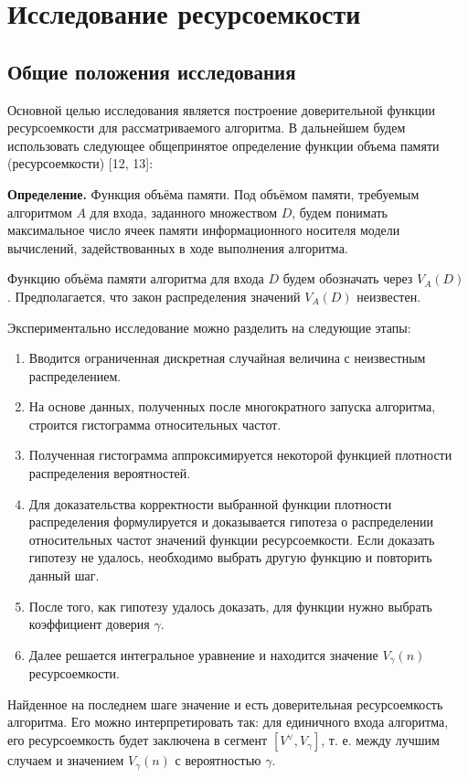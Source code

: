 \section{Исследование ресурсоемкости}
\subsection{Общие положения исследования}

Основной целью исследования является построение доверительной
функции ресурсоемкости для рассматриваемого алгоритма. В дальнейшем будем использовать следующее общепринятое определение функции объема памяти (ресурсоемкости) [12, 13]:
\par
\textbf{Определение.} Функция объёма памяти. Под объёмом памяти, требуемым алгоритмом $A$ для входа, заданного множеством $D$, будем понимать максимальное число ячеек памяти информационного носителя модели вычислений, задействованных в ходе выполнения алгоритма.

Функцию объёма памяти алгоритма для входа $D$ будем обозначать через $V_A(D)$. Предполагается, что закон распределения значений $V_A(D)$ неизвестен.

Экспериментально исследование можно разделить на следующие этапы:
\begin{enumerate}
\item Вводится ограниченная дискретная случайная величина с неизвестным распределением.
\item На основе данных, полученных после многократного запуска алгоритма, строится гистограмма относительных частот.
\item Полученная гистограмма аппроксимируется некоторой функцией плотности распределения вероятностей.
\item Для доказательства корректности выбранной функции плотности распределения формулируется и доказывается гипотеза о распределении относительных частот значений функции ресурсоемкости. Если доказать гипотезу не удалось, необходимо выбрать другую функцию и повторить данный шаг.
\item После того, как гипотезу удалось доказать, для функции нужно выбрать коэффициент доверия $\gamma$.
\item Далее решается интегральное уравнение и находится значение $V_{\gamma}(n)$ ресурсоемкости.
\end{enumerate}

Найденное на последнем шаге значение и есть доверительная ресурсоемкость алгоритма. Его можно интерпретировать так: для единичного входа алгоритма, его ресурсоемкость будет заключена в сегмент $[V^{\vee}, V_{\gamma}]$, т. е. между лучшим случаем и значением $V_{\gamma}(n)$ с вероятностью $\gamma$.

